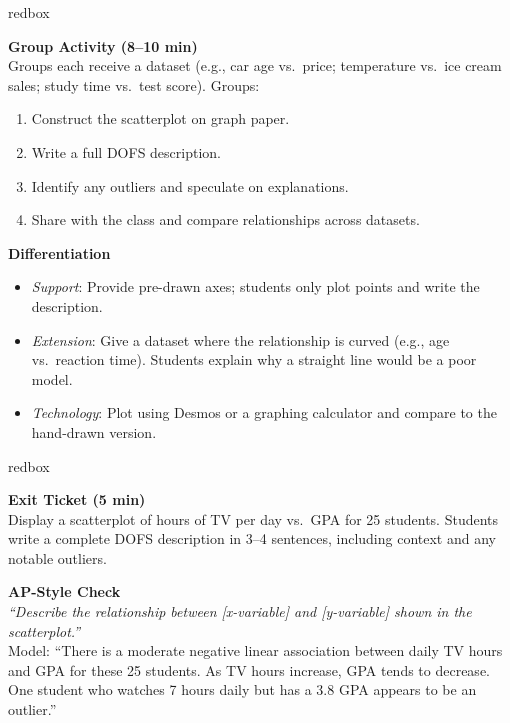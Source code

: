 \documentclass[10pt]{article}
\begin{document}
\begin{skillbox}{redbox}
\begin{minipage}[t]{0.48\linewidth}
    \textbf{Group Activity (8--10 min)}\\
    Groups each receive a dataset (e.g., car age vs.\ price; temperature vs.\ ice cream sales;
    study time vs.\ test score). Groups:
    \begin{enumerate}
        \item Construct the scatterplot on graph paper.
        \item Write a full DOFS description.
        \item Identify any outliers and speculate on explanations.
        \item Share with the class and compare relationships across datasets.
    \end{enumerate}
\end{minipage}
\hfill
\begin{minipage}[t]{0.48\linewidth}
    \textbf{Differentiation}
    \begin{itemize}
        \item \textit{Support}: Provide pre-drawn axes; students only plot points and write the description.
        \item \textit{Extension}: Give a dataset where the relationship is curved (e.g., age vs.\ reaction time). Students explain why a straight line would be a poor model.
        \item \textit{Technology}: Plot using Desmos or a graphing calculator and compare to the hand-drawn version.
    \end{itemize}
\end{minipage}
\end{skillbox}

\begin{skillbox}{redbox}
\begin{minipage}[t]{0.48\linewidth}
    \textbf{Exit Ticket (5 min)}\\
    Display a scatterplot of hours of TV per day vs.\ GPA for 25 students. Students write a
    complete DOFS description in 3--4 sentences, including context and any notable outliers.
\end{minipage}
\hfill
\begin{minipage}[t]{0.48\linewidth}
    \textbf{AP-Style Check}\\
    \textit{``Describe the relationship between [x-variable] and [y-variable] shown in the scatterplot.''}\\[4pt]
    Model: ``There is a moderate negative linear association between daily TV hours and GPA for
    these 25 students. As TV hours increase, GPA tends to decrease. One student who watches
    7 hours daily but has a 3.8 GPA appears to be an outlier.''
\end{minipage}
\end{skillbox}
\end{document}
